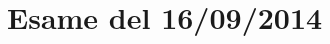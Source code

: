 \documentclass[\main/main.tex]{subfiles}
\begin{document}
\section{Esame del 16/09/2014}

\clearpage

\clearpage

\end{document}
